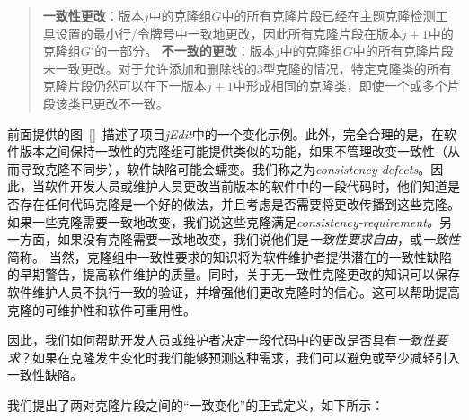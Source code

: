 \begin{quote}
{\bf 一致性更改}：版本$ j $中的克隆组$ G $中的所有克隆片段已经在主题克隆检测工具设置的最小行/令牌号中一致地更改，因此所有克隆片段在版本$ j + 1 $中的克隆组$ G'$的一部分。
{\bf 不一致的更改}：版本$ j $中的克隆组$ G $中的所有克隆片段未一致更改。对于允许添加和删除线的3型克隆的情况，特定克隆类的所有克隆片段仍然可以在下一版本$ j + 1 $中形成相同的克隆类，即使一个或多个片段该类已更改不一致。
\end{quote}


前面提供的图~\ref{}~描述了项目{\em  jEdit}中的一个变化示例。此外，完全合理的是，在软件版本之间保持一致性的克隆组可能提供类似的功能，如果不管理改变一致性（从而导致克隆不同步），软件缺陷可能会蠕变。我们称之为{\em consistency-defects}。因此，当软件开发人员或维护人员更改当前版本的软件中的一段代码时，他们知道是否存在任何代码克隆是一个好的做法，并且考虑是否需要将更改传播到这些克隆。如果一些克隆需要一致地改变，我们说这些克隆满足{\em consistency-requirement。}另一方面，如果没有克隆需要一致地改变，我们说他们是{\em  一致性要求自由}，或{\em  一致性}简称。
当然，克隆组中一致性要求的知识将为软件维护者提供潜在的一致性缺陷的早期警告，提高软件维护的质量。同时，关于无一致性克隆更改的知识可以保存软件维护人员不执行一致的验证，并增强他们更改克隆时的信心。这可以帮助提高克隆的可维护性和软件可重用性。

因此，我们如何帮助开发人员或维护者决定一段代码中的更改是否具有{\em 一致性要求}？如果在克隆发生变化时我们能够预测这种需求，我们可以避免或至少减轻引入一致性缺陷。


我们提出了两对克隆片段之间的“一致变化”的正式定义，如下所示：
\\

  
